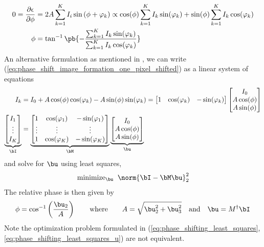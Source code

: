 \documentclass[../writeup.tex]{subfiles}
\begin{document}
\begin{align*}
    0
        = \frac{\partial \epsilon}{\partial \phi}
        &= 2A \sum_{k=1}^K I_i\sin \left( \phi + \varphi_k \right)
        \propto \cos(\phi) \sum_{k=1}^K I_k \sin(\varphi_k) + \sin(\phi) \sum_{k=1}^{K} I_k \cos(\varphi_k) \\
    \phi
        &= \tan^{-1}\pb{
            -
            \frac{
                \sum_{k=1}^K I_k \sin(\varphi_k)
            }{
                \sum_{k=1}^K I_k \cos(\varphi_k)
            }
        }
\end{align*}
An alternative formulation as mentioned in \cite{guptaMicroPhaseShifting2012}, we can write (\ref{eq:phase_shift_image_formation_one_pixel_shifted}) as a linear system of equations
\begin{align*}
    I_k
        &= I_0 + A\cos(\phi)\cos(\varphi_k) - A\sin(\phi)\sin(\varphi_k)
        = \begin{bmatrix}
            1 & \cos(\varphi_k) & -\sin(\varphi_k)
        \end{bmatrix}
        \begin{bmatrix}
            I_0 \\ A\cos(\phi) \\ A\sin(\phi)
        \end{bmatrix} \\
    \underbrace{
        \begin{bmatrix}
            I_1 \\ \vdots \\ I_K
        \end{bmatrix}
    }_{\bI}
        &= 
        \underbrace{
            \begin{bmatrix}
                1 & \cos(\varphi_1) & -\sin(\varphi_1) \\
                \vdots & \vdots & \vdots \\
                1 & \cos(\varphi_K) & -\sin(\varphi_K) \\
            \end{bmatrix}
        }_{\bM}
        \underbrace{
            \begin{bmatrix}
                I_0 \\ A\cos(\phi) \\ A\sin(\phi)
            \end{bmatrix}
        }_{\bu}
\end{align*}
and solve for $\bu$ using least squares,
\begin{align}
    \text{minimize}_{\bu}\;\;
        \norm{\bI-\bM\bu}_2^2
    \label{eq:phase_shifting_least_squares_u}
\end{align}
The relative phase is then given by
\begin{align*}
    \phi 
        = \cos^{-1}\left( \frac{\bu_2}{A} \right)
    \qquad\text{where}\qquad
    A
        = \sqrt{\bu_2^2 + \bu_3^2}
    \quad\text{and}\quad
    \bu
        = M^{\dagger} \bI
\end{align*}
Note the optimization problem formulated in (\ref{eq:phase_shifting_least_squares},\ref{eq:phase_shifting_least_squares_u}) are not equivalent. 
\end{document}
